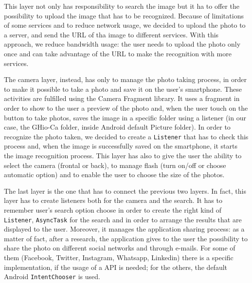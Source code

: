 This layer not only has responsibility to search the image but it ha to offer
the possibility to upload the image that has to be recognized. Because of
limitations of some services and to reduce network usage, we decided to upload the
photo to a server, and send the URL of tha image to different services.
With this approach, we reduce bandwidth usage: the user needs to upload the
photo only once and can take advantage of the URL to make the recognition with
more services.

The camera layer, instead, has only to manage the photo taking process, in order
to make it possible to take a photo and save it on the user's smartphone. These
activities are fulfilled using the Camera Fragment library. It uses a fragment
in order to show to the user a preview of the photo and, when the user touch on
the button to take photos, saves the image in a specific folder using a
listener (in our case, the GHio-Ca folder, inside Android default Picture
folder). In order to recognize the photo taken, we decided to create a
\texttt{Listener} that has to check this process and, when the image is successfully
saved on the smartphone, it starts the image recognition process.
This layer has also to give the user the ability to select the camera (frontal
or back), to manage flash (turn on/off or choose automatic option) and to enable
the user to choose the size of the photos.

The last layer is the one that has to connect the previous two layers. In fact,
this layer has to create listeners both for the camera and the search. It has
to remember user's search option choose in order to create the right kind of
\texttt{Listener}, \texttt{AsyncTask} for the search and in order to arrange the results
that are displayed to the user. Moreover, it manages the application
sharing
process: as a matter of fact, after a research, the application gives to the user the
possibility to share the photo on different social networks and
through e-mails. For some of them (Facebook, Twitter, Instagram, Whatsapp,
Linkedin) there is a specific implementation, if the usage of a API is needed;
for the others, the default Android \texttt{IntentChooser} is used.
